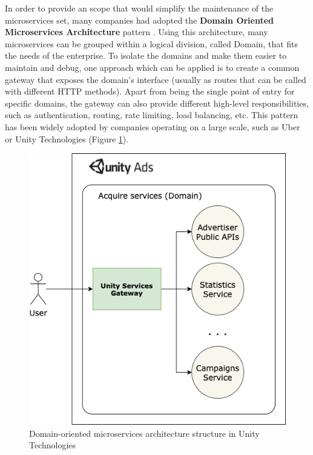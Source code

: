 \documentclass[english, 12pt, a4paper, sci, utf8, a-1b, online]{aaltothesis}
\begin{document}
In order to provide an scope that would simplify the maintenance of the microservices set, many companies had adopted the \textbf{Domain Oriented Microservices Architecture} pattern \cite{DOMAUber}. Using this architecture, many microservices can be grouped within a logical division, called Domain, that fits the needs of the enterprise. To isolate the domains and make them easier to maintain and debug, one approach which can be applied is to create a common gateway that exposes the domain's interface (usually as routes that can be called with different HTTP methods). Apart from being the single point of entry for specific domains, the gateway can also provide different high-level responsibilities, such as authentication, routing, rate limiting, load balancing, etc. This pattern has been widely adopted by companies operating on a large scale, such as Uber \cite{GatewayUber} or Unity Technologies (Figure \ref{fig:unity-acquire-domain}).\\

\begin{figure}[h]
    \centering
    \includegraphics[scale=0.3]{src/proposal/img/unity-services-diagram.png}
    \caption{Domain-oriented microservices architecture structure in Unity Technologies}
    \label{fig:unity-acquire-domain}
\end{figure}
\end{document}
